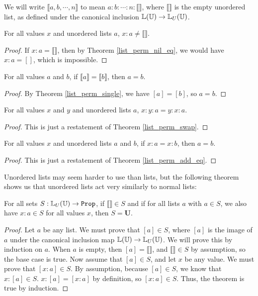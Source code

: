 \documentclass[../math.tex]{subfiles}
\begin{document}
We will write $\llbracket a, b, \cdots, n\rrbracket$ to mean $a : b : \cdots : n
: \llbracket \rrbracket$, where $\llbracket \rrbracket$ is the empty unordered
list, as defined under the canonical inclusion $\mathbb{L}(\mathbb{U}) \to \mathbb{L}_U(\mathbb{U})$.

\begin{theorem} \label{ulist_end_neq}
    For all values $x$ and unordered lists $a$, $x : a \neq \llbracket
    \rrbracket$.
\end{theorem}
\begin{proof}
    If $x : a = \llbracket \rrbracket$, then by Theorem \ref{list_perm_nil_eq},
    we would have $x : a = []$, which is impossible.
\end{proof}

\begin{theorem} \label{ulist_single_eq}
    For all values $a$ and $b$, if $\llbracket a \rrbracket = \llbracket b
    \rrbracket$, then $a = b$.
\end{theorem}
\begin{proof}
    By Theorem \ref{list_perm_single}, we have $[a] = [b]$, so $a = b$.
\end{proof}

\begin{theorem} \label{ulist_swap}
    For all values $x$ and $y$ and unordered lists $a$, $x : y : a = y : x : a$.
\end{theorem}
\begin{proof}
    This is just a restatement of Theorem \ref{list_perm_swap}.
\end{proof}

\begin{theorem} \label{ulist_add_eq}
    For all values $x$ and unordered lists $a$ and $b$, if $x : a = x : b$, then
    $a = b$.
\end{theorem}
\begin{proof}
    This is just a restatement of Theorem \ref{list_perm_add_eq}.
\end{proof}

Unordered lists may seem harder to use than lists, but the following theorem
shows us that unordered lists act very similarly to normal lists:

\begin{theorem}
    For all sets $S : \set{\L_U(\U)}$, if $\llbracket\rrbracket \in S$ and if
    for all lists $a$ with $a \in S$, we also have $x : a \in S$ for all values
    $x$, then $S = \bm U$.
\end{theorem}
\begin{proof}
    Let $a$ be any list.  We must prove that $[a] \in S$, where $[a]$ is the
    image of $a$ under the canonical inclusion map $\mathbb{L}(\mathbb{U}) \to \mathbb{L}_U(\mathbb{U})$.  We
    will prove this by induction on $a$.  When $a$ is empty, then $[a] =
    \llbracket \rrbracket$, and $\llbracket \rrbracket \in S$ by assumption, so
    the base case is true.  Now assume that $[a] \in S$, and let $x$ be any
    value.  We must prove that $[x : a] \in S$.  By assumption, because $[a] \in
    S$, we know that $x : [a] \in S$.  $x : [a] = [x : a]$ by definition, so $[x
    : a] \in S$.  Thus, the theorem is true by induction.
\end{proof}
\end{document}
